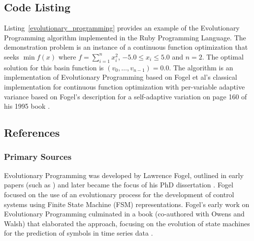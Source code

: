 \subsection{Code Listing}
Listing~\ref{evolutionary_programming} provides an example of the Evolutionary Programming algorithm implemented in the Ruby Programming Language.
The demonstration problem is an instance of a continuous function optimization that seeks $\min f(x)$ where $f=\sum_{i=1}^n x_{i}^2$, $-5.0\leq x_i \leq 5.0$ and $n=2$. The optimal solution for this basin function is $(v_0,\ldots,v_{n-1})=0.0$.
The algorithm is an implementation of Evolutionary Programming based on Fogel et al's classical implementation for continuous function optimization \cite{Fogel1991a} with per-variable adaptive variance based on Fogel's description for a self-adaptive variation on page 160 of his 1995 book \cite{Fogel1995}.




\subsection{References}


% 
% 
\subsubsection{Primary Sources}
Evolutionary Programming was developed by Lawrence Fogel, outlined in early papers (such as \cite{Fogel1962}) and later became the focus of his PhD dissertation \cite{Fogel1964}. Fogel focused on the use of an evolutionary process for the development of control systems using Finite State Machine (FSM) representations. 
Fogel's early work on Evolutionary Programming culminated in a book (co-authored with Owens and Walsh) that elaborated the approach, focusing on the evolution of state machines for the prediction of symbols in time series data \cite{Fogel1966}.


